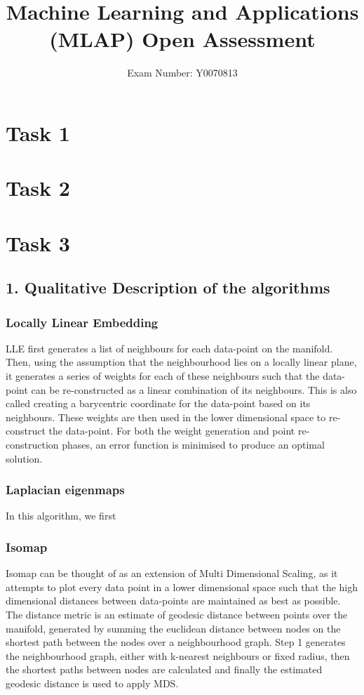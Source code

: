 \documentclass{article}
\begin{document}
	\title{Machine Learning and Applications (MLAP) Open Assessment}
	\author{Exam Number: Y0070813}
	\maketitle
	\section{Task 1}
	\section{Task 2}
	\section{Task 3}
	\subsection{1. Qualitative Description of the algorithms}
		\subsubsection{Locally Linear Embedding}
LLE first generates a list of neighbours for each data-point on the manifold. Then, using the assumption that the neighbourhood lies on a locally linear plane, it generates a series of weights for each of these neighbours such that the data-point can be re-constructed as a linear combination of its neighbours. This is also called creating a barycentric coordinate for the data-point based on its neighbours. These weights are then used in the lower dimensional space to re-construct the data-point. For both the weight generation and point re-construction phases, an error function is minimised to produce an optimal solution.
		\subsubsection{Laplacian eigenmaps}
In this algorithm, we first 
		\subsubsection{Isomap}
		Isomap can be thought of as an extension of Multi Dimensional Scaling, as it attempts to plot every data point in a lower dimensional space such that the high dimensional distances between data-points are maintained as best as possible. The distance metric is an estimate of geodesic distance between points over the manifold, generated by summing the euclidean distance between nodes on the shortest path between the nodes over a neighbourhood graph. Step 1 generates the neighbourhood graph, either with k-nearest neighbours or fixed radius, then the shortest paths between nodes are calculated and finally the estimated geodesic distance is used to apply MDS.
\end{document}
